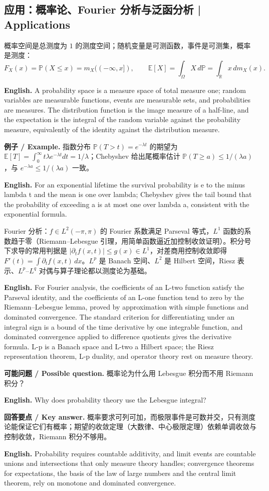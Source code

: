 \documentclass[UTF8,11pt,a4paper]{ctexart}
\newcommand{\EN}[1]{\par\noindent\textbf{English.} #1\par}
\let\APSsubsection\subsection
\renewcommand{\subsection}[1]{\Needspace{6\baselineskip}\APSsubsection{#1}}
\newcommand{\EX}[2]{\par\noindent\textbf{例子 / Example.} #1\par\EN{#2}}
\newcommand{\ASK}[4]{\par\noindent\textbf{可能问题 / Possible question.} #1\par\EN{#2}\noindent\textbf{回答要点 / Key answer.} #3\par\EN{#4}\medskip}
\begin{document}
\subsection{应用：概率论、Fourier 分析与泛函分析 | Applications}
\noindent 概率空间是总测度为 $1$ 的测度空间；随机变量是可测函数，事件是可测集，概率是测度：
\[
F_X(x)=\mathbb P(X\le x)=m_X((-\infty,x]),
\qquad
\mathbb E[X]=\int_\Omega X\,d\mathbb P=\int_{\mathbb R}x\,dm_X(x).
\]
\EN{A probability space is a measure space of total measure one; random variables are measurable functions, events are measurable sets, and probabilities are measures. The distribution function is the image measure of a half-line, and the expectation is the integral of the random variable against the probability measure, equivalently of the identity against the distribution measure.}
\EX{指数分布 $\mathbb P(T>t)=e^{-\lambda t}$ 的期望为 $\mathbb E[T]=\int_0^\infty t\lambda e^{-\lambda t}dt=1/\lambda$；Chebyshev 给出尾概率估计 $\mathbb P(T\ge a)\le1/(\lambda a)$，与 $e^{-\lambda a}\le1/(\lambda a)$ 一致。}{For an exponential lifetime the survival probability is e to the minus lambda t and the mean is one over lambda; Chebyshev gives the tail bound that the probability of exceeding a is at most one over lambda a, consistent with the exponential formula.}
\noindent Fourier 分析：$f\in L^2(-\pi,\pi)$ 的 Fourier 系数满足 Parseval 等式，$L^1$ 函数的系数趋于零（Riemann--Lebesgue 引理，用简单函数逼近加控制收敛证明）。积分号下求导的常用判据是 $|\partial_tf(x,t)|\le g(x)\in L^1$，对差商用控制收敛即得 $F'(t)=\int\partial_tf(x,t)\,dx$。$L^p$ 是 Banach 空间、$L^2$ 是 Hilbert 空间，Riesz 表示、$L^p$--$L^q$ 对偶与算子理论都以测度论为基础。
\EN{For Fourier analysis, the coefficients of an L-two function satisfy the Parseval identity, and the coefficients of an L-one function tend to zero by the Riemann--Lebesgue lemma, proved by approximation with simple functions and dominated convergence. The standard criterion for differentiating under an integral sign is a bound of the time derivative by one integrable function, and dominated convergence applied to difference quotients gives the derivative formula. L-p is a Banach space and L-two a Hilbert space; the Riesz representation theorem, L-p duality, and operator theory rest on measure theory.}
\ASK{概率论为什么用 Lebesgue 积分而不用 Riemann 积分？}{Why does probability theory use the Lebesgue integral?}{概率要求可列可加，而极限事件是可数并交，只有测度论能保证它们有概率；期望的收敛定理（大数律、中心极限定理）依赖单调收敛与控制收敛，Riemann 积分不够用。}{Probability requires countable additivity, and limit events are countable unions and intersections that only measure theory handles; convergence theorems for expectations, the basis of the law of large numbers and the central limit theorem, rely on monotone and dominated convergence.}
\end{document}
